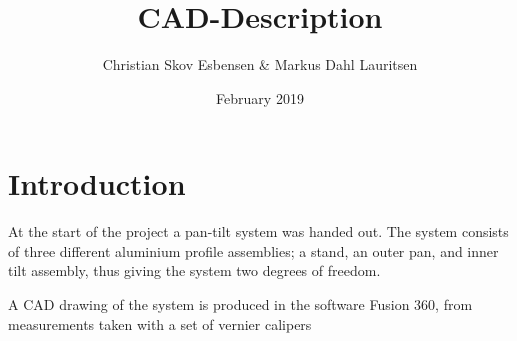 \documentclass{article}
\title{CAD-Description}
\author{Christian Skov Esbensen \& Markus Dahl Lauritsen}
\date{February 2019}
\begin{document}
\section{Introduction}
At the start of the project a pan-tilt system was handed out. The system consists of three different aluminium profile assemblies; a stand, an outer pan, and inner tilt assembly, thus giving the system two degrees of freedom.

A CAD drawing of the system is produced in the software Fusion 360, from measurements taken with a set of vernier calipers
\end{document}
